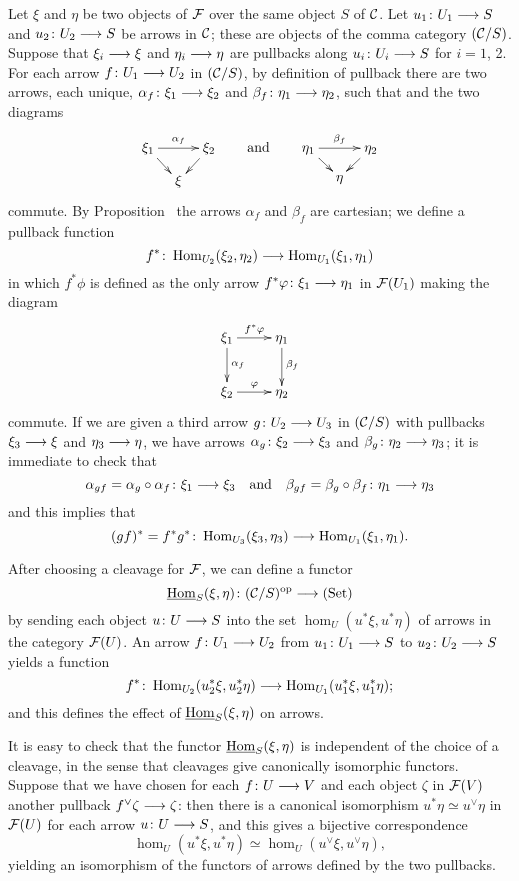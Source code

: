\begin{3   FIBERED CATEGORIES}
\begin{3.7 The functors of arrows of a fibcat}
Let $\xi$ and $\eta$ be two objects of $\mathcal{F}$ over the same object $S$ of $\mathcal{C}$. Let $u_1 \colon U_1 \arr S$  and $u_2 \colon U_2 \arr S$ be arrows in $\mathcal{C}$; these are objects of the comma category $(\mathcal{C}/S)$. Suppose that $\xi_i \arr \xi$ and $\eta_i \arr \eta$ are pullbacks along $u_i \colon U_i \arr S$ for $i=1$, 2. For each arrow $f \colon U_1 \arr U_2$ in $(\mathcal{C}/S)$, by definition of pullback there are two arrows, each unique,  $\alpha_f \colon \xi_1 \arr \xi_2$ and $\beta_f \colon \eta_1 \arr \eta_2$, such that and the two diagrams
   \[
   \xymatrix@-15pt{\xi_1\ar[rr]^{\alpha_f}\ar[rd]
   && \xi_2 \ar[ld]\\ &\xi &}\qquad
   \text{and}\qquad
   \xymatrix@-15pt{\eta_1 \ar[rr]^{\beta_f}\ar[rd]
   && \eta_2\ar[ld]\\ &\eta &}
   \]
commute. By Proposition~ the arrows $\alpha_f$ and $\beta_f$ are cartesian; we define a pullback function
   \[
   f^* \colon \hom_{U_2}(\xi_2, \eta_2) \arr
   \hom_{U_1}(\xi_1, \eta_1)
   \]
in which $f^* \phi$ is defined as the only arrow $f^* \phi \colon \xi_1 \arr \eta_1$ in $\mathcal{F}(U_1)$ making the diagram
   \[
   \xymatrix{
   \xi_1\ar[r]^{f^*\phi}\ar[d]^{\alpha_f}
   & \eta_1\ar[d]^{\beta_f}\\
   \xi_2\ar[r]^{\phi} & \eta_2
   }
   \]
commute. If we are given a third arrow $g \colon U_2 \arr U_3$ in $(\mathcal{C}/S)$ with pullbacks $\xi_3\arr \xi$ and $\eta_3 \arr \eta$, we have arrows $\alpha_g \colon \xi_2 \arr \xi_3$ and $\beta_g \colon \eta_2 \arr \eta_3$; it is immediate to check that
   \[
   \alpha_{gf} = \alpha_g \circ \alpha_f
   \colon \xi_1 \arr \xi_3\quad
   \text{and}\quad
   \beta_{gf} = \beta_g \circ \beta_f
   \colon \eta_1 \arr \eta_3
   \]
and this implies that
   \[
   (gf)^* = f^* g^* \colon \hom_{U_3}(\xi_3, \eta_3)
   \arr \hom_{U_1}(\xi_1, \eta_1).
   \]

After choosing a cleavage for $\mathcal{F}$, we can define a functor
   \[
   \underhom_S(\xi, \eta) \colon (\cC/S)\op \arr
   \catset
   \]
by sending each object $u \colon U \arr S$ into the set $\hom_U(u^* \xi, u^* \eta)$ of arrows in the category $\mathcal{F}(U)$. An arrow $f \colon U_1 \arr U_2$ from $u_1 \colon U_1 \arr S$ to $u_2 \colon U_2 \arr S$ yields a function
   \[
   f^* \colon \hom_{U_2}(u^*_2\xi, u^*_2\eta)
   \arr \hom_{U_1}(u^*_1\xi, u^*_1\eta);
   \]
and this defines the effect of $\mathop{\underline{\mathrm{Hom}}}\nolimits_S(\xi, \eta)$ on arrows.

It is easy to check that the functor $\mathop{\underline{\mathrm{Hom}}}\nolimits_S(\xi, \eta)$ is independent of the choice of a cleavage, in the sense that cleavages give canonically isomorphic functors. Suppose that we have chosen for each $f \colon U \arr V$ and each object $\zeta$ in $\mathcal{F}(V)$ another pullback $f^\vee \zeta \arr \zeta$: then there is a canonical isomorphism $u^* \eta \simeq u^\vee \eta$ in $\mathcal{F}(U)$ for each arrow $u \colon U \arr S$, and this gives a bijective correspondence
   \[
   \hom_U(u^* \xi, u^* \eta) \simeq \hom_U(u^\vee
   \xi, u^\vee \eta),
   \]
yielding an isomorphism of the functors of arrows defined by the two pullbacks.


\end{3.7 The functors of arrows of a fibcat}
\end{3   FIBERED CATEGORIES}
